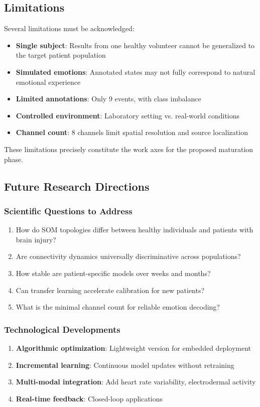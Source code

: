 \subsection{Limitations}

Several limitations must be acknowledged:

\begin{itemize}
    \item \textbf{Single subject}: Results from one healthy volunteer cannot be generalized to the target patient population
    \item \textbf{Simulated emotions}: Annotated states may not fully correspond to natural emotional experience
    \item \textbf{Limited annotations}: Only 9 events, with class imbalance
    \item \textbf{Controlled environment}: Laboratory setting vs. real-world conditions
    \item \textbf{Channel count}: 8 channels limit spatial resolution and source localization
\end{itemize}

These limitations precisely constitute the work axes for the proposed maturation phase.

\subsection{Future Research Directions}

\subsubsection{Scientific Questions to Address}

\begin{enumerate}
    \item How do SOM topologies differ between healthy individuals and patients with brain injury?
    \item Are connectivity dynamics universally discriminative across populations?
    \item How stable are patient-specific models over weeks and months?
    \item Can transfer learning accelerate calibration for new patients?
    \item What is the minimal channel count for reliable emotion decoding?
\end{enumerate}

\subsubsection{Technological Developments}

\begin{enumerate}
    \item \textbf{Algorithmic optimization}: Lightweight version for embedded deployment
    \item \textbf{Incremental learning}: Continuous model updates without retraining
    \item \textbf{Multi-modal integration}: Add heart rate variability, electrodermal activity
    \item \textbf{Real-time feedback}: Closed-loop applications
\end{enumerate}
